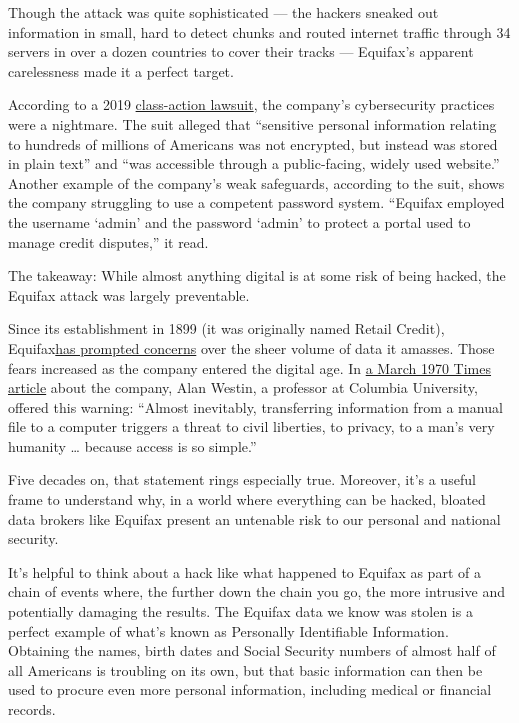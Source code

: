 Though the attack was quite sophisticated --- the hackers sneaked out
information in small, hard to detect chunks and routed internet traffic
through 34 servers in over a dozen countries to cover their tracks ---
Equifax's apparent carelessness made it a perfect target.

According to a 2019
\href{http://securities.stanford.edu/filings-documents/1063/EI00_15/2019128_r01x_17CV03463.pdf}{class-action
lawsuit}, the company's cybersecurity practices were a nightmare. The
suit alleged that ``sensitive personal information relating to hundreds
of millions of Americans was not encrypted, but instead was stored in
plain text'' and ``was accessible through a public-facing, widely used
website.'' Another example of the company's weak safeguards, according
to the suit, shows the company struggling to use a competent password
system. ``Equifax employed the username `admin' and the password `admin'
to protect a portal used to manage credit disputes,'' it read.

The takeaway: While almost anything digital is at some risk of being
hacked, the Equifax attack was largely preventable.

Since its establishment in 1899 (it was originally named Retail Credit),
Equifax\href{https://www.wired.com/1995/09/equifax/}{has prompted
concerns} over the sheer volume of data it amasses. Those fears
increased as the company entered the digital age. In
\href{https://www.nytimes.com/1970/03/12/archives/23-to-study-computer-threat.html}{a
March 1970 Times article} about the company, Alan Westin, a professor at
Columbia University, offered this warning: ``Almost inevitably,
transferring information from a manual file to a computer triggers a
threat to civil liberties, to privacy, to a man's very humanity \ldots{}
because access is so simple.''

Five decades on, that statement rings especially true. Moreover, it's a
useful frame to understand why, in a world where everything can be
hacked, bloated data brokers like Equifax present an untenable risk to
our personal and national security.

It's helpful to think about a hack like what happened to Equifax as part
of a chain of events where, the further down the chain you go, the more
intrusive and potentially damaging the results. The Equifax data we know
was stolen is a perfect example of what's known as Personally
Identifiable Information. Obtaining the names, birth dates and Social
Security numbers of almost half of all Americans is troubling on its
own, but that basic information can then be used to procure even more
personal information, including medical or financial records.

